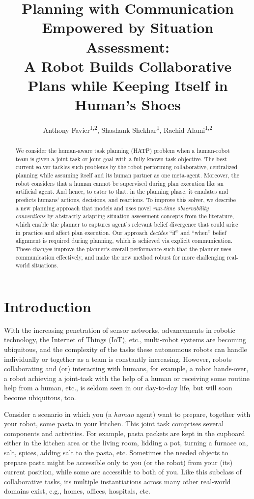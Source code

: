 \documentclass[letterpaper]{article} %
\title
{
Planning with Communication Empowered by Situation Assessment:
\\ 
A Robot Builds Collaborative Plans
while Keeping Itself in Human's Shoes 
}
\author{
    Anthony Favier\textsuperscript{\rm 1,2},
    Shashank Shekhar\textsuperscript{\rm 1},
    Rachid Alami\textsuperscript{\rm 1,2}
}
\begin{document}


\maketitle

\begin{abstract}
We consider the human-aware task planning (HATP) problem when a human-robot team is given a joint-task or joint-goal with a fully known task objective. 
The best current solver tackles such problems by the robot performing collaborative, centralized planning while assuming itself and its human partner as one meta-agent. 
Moreover, the robot considers that a human cannot be supervised during plan execution like an artificial agent. And hence, to cater to that, in the planning phase, it emulates and predicts humans' actions, decisions, and reactions. 
To improve this solver, we describe a new planning approach that models and uses novel {\em run-time observability conventions} by abstractly adapting  situation assessment concepts from the literature, which enable the planner to 
captures agent's relevant belief divergence that could arise in practice and affect plan execution. 
Our approach \textit{decides} ``if'' and ``when'' belief alignment is required during planning, which is achieved via explicit communication.
These changes improve the planner's overall performance such that the planner uses communication effectively, and make the new method robust for more challenging real-world situations.  
\end{abstract}

\section{Introduction}
With the increasing penetration of sensor networks, advancements in robotic technology, the Internet of Things (IoT), etc., multi-robot systems are becoming ubiquitous, and the complexity of the tasks these autonomous robots can handle individually or together as a team is constantly increasing.
However, robots collaborating and (or) interacting with humans, for example, a robot hands-over, a robot achieving a joint-task with the help of a human or receiving some routine help from a human, etc., is seldom seen in our day-to-day life, but will soon become ubiquitous, too.

Consider a scenario in which you (a \textit{human} agent) want to prepare, together with your robot, some pasta in your kitchen. This joint task comprises several components and activities. For example, pasta packets are kept in the cupboard either in the kitchen area or the living room, lidding a pot, turning a furnace on, salt, spices, adding salt to the pasta, etc. 
Sometimes the needed objects to prepare pasta might be accessible only to you (or the robot) from your (its) current position, while some are accessible to both of you. 
Like this subclass of collaborative tasks, its multiple instantiations across many other real-world domains exist, e.g., homes, offices, hospitals, etc.
\end{document}
